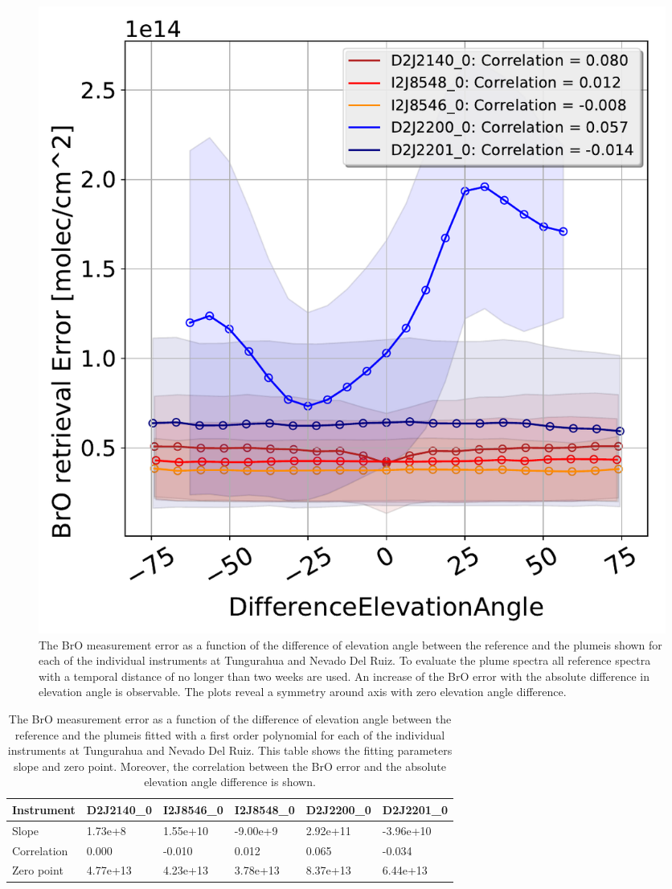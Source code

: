 \begin{figure}
	\centering
	\includegraphics[width=0.7\linewidth]{Bilder/DiffElevAngleallInstruments}
	\caption{The BrO measurement error as a function of the difference of elevation angle between the reference and the plumeis shown for each of the individual instruments at Tungurahua and Nevado Del Ruiz. To evaluate the plume spectra all reference spectra with a temporal distance of no longer than two weeks are used. An increase of the BrO error with the absolute difference in elevation angle is observable. The plots reveal a symmetry around axis with zero elevation angle difference.}
	\label{fig:diffeleangle}
\end{figure}
\begin{table}[h]
	\begin{tabular}{|p{2cm}|p{2cm}|p{2cm}|p{2cm}|p{2cm}|p{2cm}|}
		Instrument	&D2J2140\_0&I2J8546\_0& I2J8548\_0&D2J2200\_0&D2J2201\_0\\
		\toprule
		Slope& 1.73e+8& 1.55e+10  &-9.00e+9 &2.92e+11&-3.96e+10\\
		\midrule
		Correlation&
		0.000&
		-0.010&
		0.012&
		0.065&
		-0.034\\
		\midrule
		Zero point&4.77e+13&4.23e+13&3.78e+13&8.37e+13 &6.44e+13 \\
		\bottomrule
	\end{tabular}
	\caption{The BrO measurement error as a function of the difference of elevation angle between the reference and the plumeis fitted with a first order polynomial for each of the individual instruments at Tungurahua and Nevado Del Ruiz. This table shows the fitting parameters slope and zero point. Moreover, the correlation between the BrO error and the absolute elevation angle difference is shown. }
\end{table}
